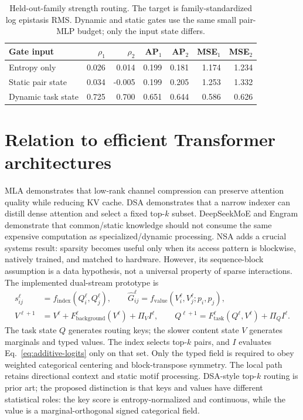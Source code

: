 \documentclass[10pt]{article}
\begin{document}
\begin{table}[ht]
\centering
\small
\begin{tabular}{lrrrrrr}
\toprule
Gate input & $\rho_1$ & $\rho_2$ & AP$_1$ & AP$_2$ & MSE$_1$ & MSE$_2$ \\
\midrule
Entropy only & 0.026 & 0.014 & 0.199 & 0.181 & 1.174 & 1.234 \\
Static pair state & 0.034 & -0.005 & 0.199 & 0.205 & 1.253 & 1.332 \\
Dynamic task state & 0.725 & 0.700 & 0.651 & 0.644 & 0.586 & 0.626 \\
\bottomrule
\end{tabular}
\caption{Held-out-family strength routing.  The target is family-standardized log epistasis
RMS.  Dynamic and static gates use the same small pair-MLP budget; only the input state differs.}
\label{tab:dynamic-strength}
\end{table}
\FloatBarrier

\section{Relation to efficient Transformer architectures}

MLA demonstrates that low-rank channel compression can preserve attention quality while
reducing KV cache.  DSA demonstrates that a narrow indexer can distill dense attention and
select a fixed top-$k$ subset.  DeepSeekMoE and Engram demonstrate that common/static
knowledge should not consume the same expensive computation as specialized/dynamic
processing.  NSA adds a crucial systems result: sparsity becomes useful only when its access
pattern is blockwise, natively trained, and matched to hardware.  However, its sequence-block
assumption is a data hypothesis, not a universal property of sparse interactions.  The
implemented dual-stream prototype is
\begin{align}
s_{ij}^{\ell}&=f_{\mathrm{index}}(Q_i^\ell,Q_j^\ell),\qquad
\widehat G_{ij}^{\ell}=f_{\mathrm{value}}(V_i^\ell,V_j^\ell;p_i,p_j),\\
V^{\ell+1}&=V^\ell+F_{\mathrm{background}}^\ell(V^\ell)+\Pi_V I^\ell,\qquad
Q^{\ell+1}=F_{\mathrm{task}}^\ell(Q^\ell,V^\ell)+\Pi_Q I^\ell.
\label{eq:dual-stream}
\end{align}
The task state $Q$ generates routing keys; the slower content state $V$ generates marginals and
typed values.  The index selects top-$k$ pairs, and $I$ evaluates Eq.~\ref{eq:additive-logits}
only on that set.  Only the
typed field is required to obey weighted categorical centering and block-transpose symmetry.  The
local path retains directional context and static motif processing.  DSA-style top-$k$ routing
is prior art; the proposed distinction is that keys and values have different statistical roles:
the key score is entropy-normalized and continuous, while the value is a marginal-orthogonal
signed categorical field.
\end{document}
